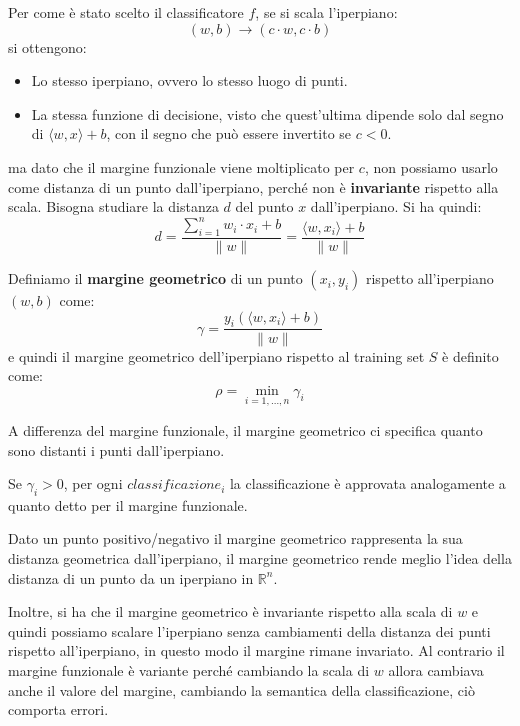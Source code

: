 Per come è stato scelto il classificatore $f$, se si scala l'iperpiano:
\begin{equation}
    (w, b) \to (c \cdot w, c\cdot b)
\end{equation}
si ottengono:
\begin{itemize}
    \item Lo stesso iperpiano, ovvero lo stesso luogo di punti.
    \item La stessa funzione di decisione, visto che quest'ultima dipende solo
          dal segno di $\langle w, x \rangle + b$, con il segno che può essere
          invertito se $c < 0$.
\end{itemize}
ma dato che il margine funzionale viene moltiplicato per $c$, non possiamo usarlo
come distanza di un punto dall'iperpiano, perché non è \textbf{invariante} rispetto
alla scala. Bisogna studiare la distanza $d$ del punto $x$ dall'iperpiano. Si ha
quindi:
\begin{equation}
    d = \frac{\sum_{i = 1} ^ n w_i \cdot x_i + b}{\| w \|} =
    \frac{\langle w, x_i \rangle + b}{\|  w \|}
\end{equation}
\begin{definizione}
    Definiamo il \textbf{margine geometrico} di un punto $(x_i, y_i)$ rispetto
    all'iperpiano $(w, b)$ come:
    \begin{equation}
        \gamma = \frac{y_i(\langle w, x_i \rangle + b)}{\| w \|}
    \end{equation}
    e quindi il margine geometrico dell'iperpiano rispetto al training set $S$ è
    definito come:
    \begin{equation}
        \rho =  \min_{i = 1, \dots, n} {\gamma}_i
    \end{equation}
\end{definizione}
A differenza del margine funzionale, il margine geometrico ci specifica quanto
sono distanti i punti dall'iperpiano.
\begin{teorema}
    Se $\gamma_i > 0$, per ogni $classificazione_i$ la classificazione è approvata
    analogamente a quanto detto per il margine funzionale.
\end{teorema}
Dato un punto positivo/negativo il margine geometrico rappresenta la sua distanza
geometrica dall'iperpiano, il margine geometrico rende meglio l'idea della distanza
di un punto da un iperpiano in $\mathbb{R}^n$.

Inoltre, si ha che il margine geometrico è invariante rispetto alla scala di $w$
e quindi possiamo scalare l'iperpiano senza cambiamenti della distanza dei punti
rispetto all'iperpiano, in questo modo il margine rimane invariato. Al contrario
il margine funzionale è variante perché cambiando la scala di $w$ allora cambiava
anche il valore del margine, cambiando la semantica della classificazione, ciò
comporta errori.

